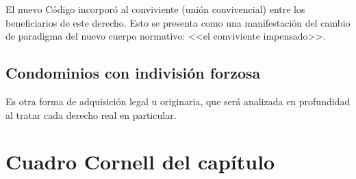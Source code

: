 \documentclass[12pt,oneside]{book}
\begin{document}
El nuevo Código incorporó al conviviente (unión convivencial) entre los beneficiarios de este derecho. Esto se presenta como una manifestación del cambio de paradigma del nuevo cuerpo normativo: <<el conviviente impensado>>.

\subsection{Condominios con indivisión forzosa}

Es otra forma de adquisición legal u originaria, que será analizada en profundidad al tratar cada derecho real en particular.

\section{Cuadro Cornell del capítulo}
\end{document}
